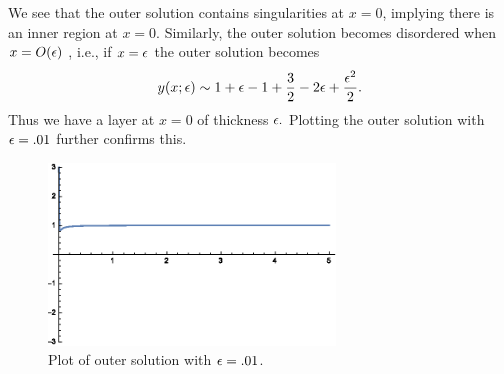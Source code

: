 \item We see that the outer solution contains singularities at $x=0$, implying there is an inner region at $x=0.$ Similarly, the outer solution becomes disordered when $x=O(\epsilon)$ , i.e., if $x=\epsilon$ the outer solution becomes
    $$y(x;\epsilon)\sim 1+\epsilon-1+\frac{3}{2}-2\epsilon+\frac{\epsilon^2}{2}.$$
    Thus we have a layer at $x=0$ of thickness $\epsilon.$ 
    Plotting the outer solution with $\epsilon=.01$ further confirms this.
    \begin{figure}[h]
    \centering
    \includegraphics[width=3in]{test1no3prtb}
    \caption{Plot of outer solution with $\epsilon=.01$.}
    \end{figure}


